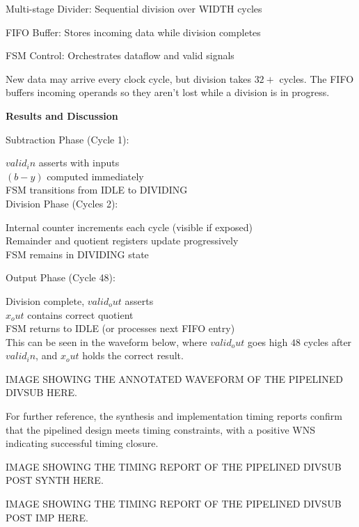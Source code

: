 \documentclass[a4paper,12pt]{article}
\begin{document}
Multi-stage Divider: Sequential division over WIDTH cycles

FIFO Buffer: Stores incoming data while division completes

FSM Control: Orchestrates dataflow and valid signals

New data may arrive every clock cycle, but division takes $32+$ cycles. The FIFO buffers incoming operands so they aren't lost while a division is in progress.

\textbf{Results and Discussion}

Subtraction Phase (Cycle 1):

$valid_in$ asserts with inputs\\
$(b-y)$ computed immediately\\
FSM transitions from IDLE to DIVIDING\\

Division Phase (Cycles 2):

Internal counter increments each cycle (visible if exposed)\\
Remainder and quotient registers update progressively\\
FSM remains in DIVIDING state

Output Phase (Cycle 48):

Division complete, $valid_out$ asserts\\
$x_out$ contains correct quotient\\
FSM returns to IDLE (or processes next FIFO entry)\\

This can be seen in the waveform below, where $valid_out$ goes high $48$ cycles after $valid_in$, and $x_out$ holds the correct result.

\begin{large}
    IMAGE SHOWING THE ANNOTATED WAVEFORM OF THE PIPELINED DIVSUB HERE.
\end{large}

For further reference, the synthesis and implementation timing reports confirm that the pipelined design meets timing constraints, with a positive WNS indicating successful timing closure.

\begin{large}
    IMAGE SHOWING THE TIMING REPORT OF THE PIPELINED DIVSUB POST SYNTH HERE.
\end{large}

\begin{large}
    IMAGE SHOWING THE TIMING REPORT OF THE PIPELINED DIVSUB POST IMP HERE.
\end{large}
\end{document}
